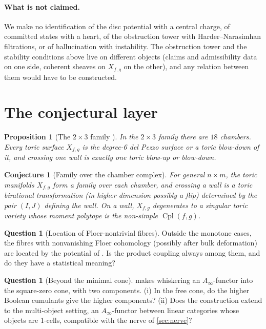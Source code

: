 \documentclass[11pt]{article}
\newtheorem{proposition}[theorem]{Proposition}
\newtheorem{conjecture}[theorem]{Conjecture}
\theoremstyle{definition}
\newtheorem{question}[theorem]{Question}
\theoremstyle{remark}
\newcommand{\Cpl}{\operatorname{Cpl}}
\begin{document}
\paragraph{What is not claimed.} We make no identification of the disc potential with a central
charge, of committed states with a heart, of the obstruction tower with Harder--Narasimhan filtrations,
or of hallucination with instability. The obstruction tower and the stability conditions above live
on different objects (claims and admissibility data on one side, coherent sheaves on $X_{f,g}$ on the
other), and any relation between them would have to be constructed.

\section{The conjectural layer}\label{sec:conjectural}

\begin{proposition}[The $2\times3$ family {\cite[\S3]{Awasthi-Family}}]\label{prop:family23}
In the $2\times3$ family there are $18$ chambers. Every toric surface $X_{f,g}$ is the degree-6 del Pezzo surface or a
toric blow-down of it, and crossing one wall is exactly one toric blow-up or blow-down.
\end{proposition}

\begin{conjecture}[Family over the chamber complex]\label{conj:family}
For general $n\times m$, the toric manifolds $X_{f,g}$ form a family over each chamber, and crossing a wall is a toric
birational transformation (in higher dimension possibly a flip) determined by the pair $(I,J)$ defining the wall. On a
wall, $X_{f,g}$ degenerates to a singular toric variety whose moment polytope is the non-simple $\Cpl(f,g)$.
\end{conjecture}

\begin{question}[Location of Floer-nontrivial fibres]\label{q:location}
Outside the monotone cases, the fibres with nonvanishing Floer cohomology (possibly after bulk
deformation) are located by the potential of \cite{FOOO2010}. Is the product coupling always among
them, and do they have a statistical meaning?
\end{question}

\begin{question}[Beyond the minimal cone]\label{conj:ainfty}
 makes whiskering an $A_\infty$-functor into the square-zero cone, with two components. (i) In the free cone,
do the higher Boolean cumulants give the higher components? (ii) Does the construction extend to the
multi-object setting, an $A_\infty$-functor between linear categories whose objects are 1-cells, compatible with the
nerve of \cref{sec:nerve}?
\end{question}
\end{document}
